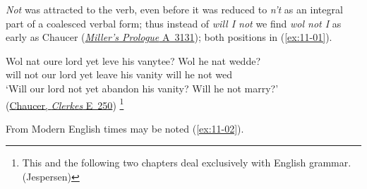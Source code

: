 \label{ch:11}

\textit{Not} was attracted to the verb, even before it was reduced to \textit{n't} as an integral part of a coalesced verbal form; thus instead of \textit{will I not} we find 
\textit{wol not I} as early as Chaucer (\href{https://archive.org/details/completeworksofg04chauuoft/completeworksofg04chauuoft/page/90/mode/2up?q=%22wol+nat+I%22&view=theater}{\textit{Miller's Prologue} A~3131}); both positions in (\ref{ex:11-01}).

\ea \label{ex:11-01}
\gll Wol nat oure lord yet leve his vanytee? Wol he nat wedde?\\
will not our lord yet leave his vanity will he not wed\\
\glt `Will our lord not yet abandon his vanity? Will he not marry?'\\\hfill(\href{https://archive.org/details/completeworksofg04chauuoft/completeworksofg04chauuoft/page/396/mode/2up?q=%22wol+nat+our%22&view=theater}{Chaucer, \textit{Clerkes} E~250})%
\footnote{This and the following two chapters deal exclusively with English grammar. (Jespersen)}
\z 

From Modern English times may be noted (\ref{ex:11-02}).
%

